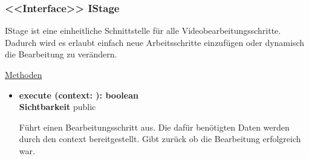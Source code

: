 \subsubsection{<<Interface>> IStage} \label{service:klasse:IStage}
IStage ist eine einheitliche Schnittstelle für alle Videobearbeitungsschritte. Dadurch wird es erlaubt einfach neue Arbeitsschritte einzufügen oder dynamisch die Bearbeitung zu verändern.\newline

\underline{Methoden}
\begin{itemize}
\itemsep0pt
\item \textbf{execute (context: ): boolean}\hfill\\
\textbf{Sichtbarkeit} public

Führt einen Bearbeitungsschritt aus. Die dafür benötigten Daten werden durch den context bereitgestellt. Gibt zurück ob die Bearbeitung erfolgreich war.

\end{itemize}